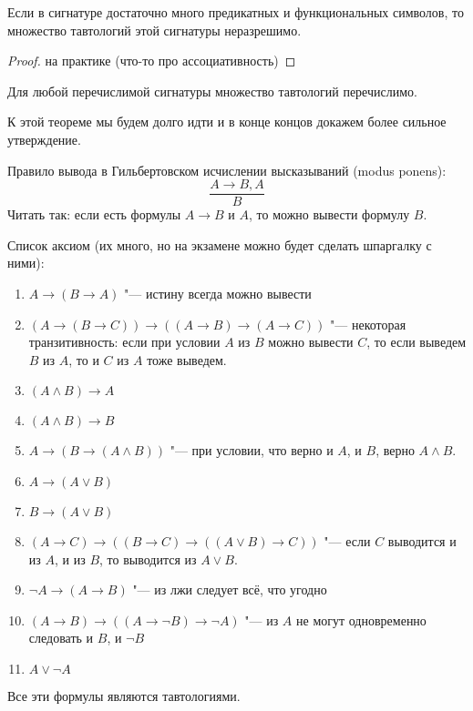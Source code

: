 \begin{theorem}
	Если в сигнатуре достаточно много предикатных и функциональных символов, то множество тавтологий этой
	сигнатуры неразрешимо.
\end{theorem}
\begin{proof}
	\TODO на практике (что-то про ассоциативность)
\end{proof}

\begin{theorem}
	Для любой перечислимой сигнатуры множество тавтологий перечислимо.
\end{theorem}
\begin{Rem}
	К этой теореме мы будем долго идти и в конце концов докажем более сильное утверждение.
\end{Rem}

\begin{Def}
	Правило вывода в Гильбертовском исчислении высказываний (modus ponens):
	\[ \frac{A \to B, A}{B} \]
	Читать так: если есть формулы $A \to B$ и $A$, то можно вывести формулу $B$.
\end{Def}

Список аксиом (их много, но на экзамене можно будет сделать шпаргалку с ними):
\begin{enumerate}
\item $A \to (B \to A)$ "--- истину всегда можно вывести
\item $(A \to (B \to C)) \to ((A \to B) \to (A \to C))$ "--- некоторая транзитивность: если при условии $A$ из $B$ можно вывести $C$, то если выведем $B$ из $A$, то и $C$ из $A$ тоже выведем.
\item $(A \land B) \to A$
\item $(A \land B) \to B$
\item $A \to (B \to (A \land B))$ "--- при условии, что верно и $A$, и $B$, верно $A \land B$.
\item $A \to (A \lor B)$
\item $B \to (A \lor B)$
\item $(A \to C) \to ((B \to C) \to ((A \lor B) \to C))$ "--- если $C$ выводится и из $A$, и из $B$, то выводится из $A \lor B$.
\item $\lnot A \to (A \to B)$ "--- из лжи следует всё, что угодно
\item $(A \to B) \to ((A \to \lnot B) \to \lnot A)$ "--- из $A$ не могут одновременно следовать и $B$, и $\lnot B$
\item $A \lor \lnot A$
\end{enumerate}
Все эти формулы являются тавтологиями.

